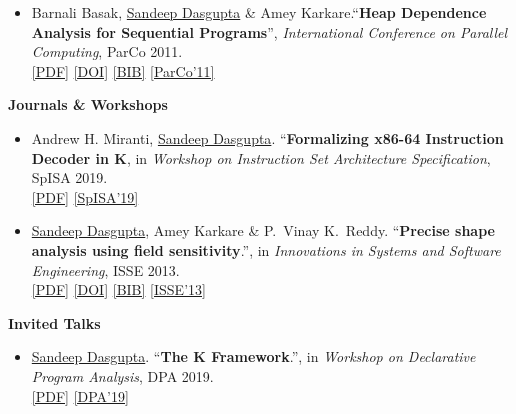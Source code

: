 \documentclass[9pt]{article}
\newenvironment{changemargin}[2]{%
  \begin{list}{}{%
    \setlength{\topsep}{0pt}%
    \setlength{\leftmargin}{#1}%
    \setlength{\rightmargin}{#2}%
    \setlength{\listparindent}{\parindent}%
    \setlength{\itemindent}{\parindent}%
    \setlength{\parsep}{\parskip}%
  }%
  \item[]}{\end{list}
}
\newenvironment{body} {
	\vspace*{-16pt}
	\begin{changemargin}{-0.25in}{-0.5in}
  }	
	{\end{changemargin}
}
\begin{document}
\begin{body}
\begin{itemize}
		\item Barnali Basak, \underline{Sandeep Dasgupta} \& Amey Karkare.``\textbf{Heap Dependence Analysis for Sequential Programs}'', \emph{International Conference on Parallel Computing}, ParCo 2011. \\ 
                \href{https://sdasgup3.github.io/files/parco_2011.pdf}{[PDF]}
                \href{http://dx.doi.org/10.3233/978-1-61499-041-3-99}{[DOI]}
                \href{https://sdasgup3.github.io/files/parco_2011.bib}{[BIB]}
                \href{http://parco2011.elis.ugent.be/}{[ParCo'11]}
	\end{itemize}

\textbf{Journals \& Workshops}\\
\vspace{-4pt}
\begin{itemize} \itemsep -0pt
     \item  Andrew H. Miranti, \underline{Sandeep Dasgupta}. ``\textbf{Formalizing x86-64 Instruction Decoder in K}, in \emph{Workshop on Instruction Set Architecture Specification}, SpISA 2019. \\
     \href{https://sdasgup3.github.io/files/spisa_2019.pdf}{[PDF]}
     \href{https://www.cl.cam.ac.uk/~jrh13/spisa19.html}{[SpISA'19]}

    \item \underline{Sandeep Dasgupta}, Amey Karkare \& P.\ Vinay K.\ Reddy. ``\textbf{Precise shape analysis using field sensitivity}.'', in \emph{Innovations in Systems and Software Engineering}, ISSE 2013. \\
    \href{https://sdasgup3.github.io/files/isse_2013.pdf}{[PDF]}
    \href{http://www.springerlink.com/openurl.asp?genre=article&id=doi:10.1007/s11334-013-0198-7}{[DOI]}
    \href{https://sdasgup3.github.io/files/isse_2013.bib}{[BIB]}
    \href{https://link.springer.com/journal/11334}{[ISSE'13]}
\end{itemize}

\textbf{Invited Talks}\\
\vspace{-4pt}
\begin{itemize} \itemsep -0pt
    \item  \underline{Sandeep Dasgupta}. ``\textbf{The K Framework}.'', in \emph{Workshop on Declarative Program Analysis}, DPA 2019. \\
    \href{https://sdasgup3.github.io/files/dpa_2019.pdf}{[PDF]}
    \href{https://pldi19.sigplan.org/details/dpa-2019-papers/5/The-K-Framework}{[DPA'19]}
\end{itemize}


\end{body}
\end{document}
